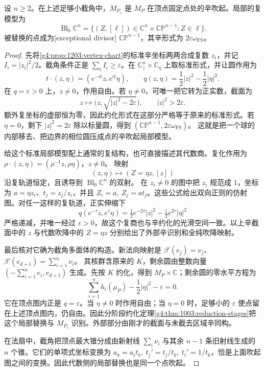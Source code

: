 \begin{proposition}\label{g4:prop:1205:corner-blowup}
	设 \(n\ge2\)。在上述足够小截角中，\(M_{P_\varepsilon}\) 是 \(M_P\) 在顶点固定点处的辛吹起。局部的复模型为
	\[
		\operatorname{Bl}_0\mathbb C^n
		=\{(Z,[\ell])\in\mathbb C^n\times\mathbb{CP}^{n-1}:Z\in\ell\}.
	\]
	被替换的点成为[exceptional divisor]
	\(\mathbb{CP}^{n-1}\)，其辛形式为 \(2\varepsilon\omega_{\mathrm{FS}}\)。
\end{proposition}
\begin{proof}
	先将\cref{g4:prop:1203:vertex-chart}的标准辛坐标两两合成复数 \(z_i\)，并记
	\(I_i=|z_i|^2/2\)。截角条件正是 \(\sum_iI_i\ge\varepsilon\)。在
	\(\mathbb C^n_z\times\mathbb C_\eta\) 上取标准形式，并让圆作用为
	\[
		t\cdot(z,\eta)=(e^{-it}z,e^{it}\eta),\qquad
		q(z,\eta)=\frac12|z|^2-\frac12|\eta|^2.
	\]
	在 \(q=\varepsilon>0\) 上，\(z\ne0\)，作用自由。若 \(\eta\ne0\)，可唯一把它转为正实数，截面为
	\[
		z\longmapsto\bigl(z,\sqrt{|z|^2-2\varepsilon}\bigr),
		\qquad |z|^2>2\varepsilon.
	\]
	额外复坐标的虚部恒为零，因此约化形式在这部分严格等于原来的标准形式。若 \(\eta=0\)，剩下
	\(|z|^2=2\varepsilon\) 除以标量圆，得到
	\((\mathbb{CP}^{n-1},2\varepsilon\omega_{\mathrm{FS}})\)。
	这就是把一个球的内部移去、把边界的相位圆压成点的辛吹起局部模型。

	给这个标准局部模型配上通常的复结构，也可直接描述其代数商。复化作用为
	\(\rho\cdot(z,\eta)=(\rho^{-1}z,\rho\eta)\)，\(z\ne0\)。
	映射
	\[
		(z,\eta)\longmapsto(Z=\eta z,[z])
	\]
	沿复轨道恒定，且诱导到 \(\operatorname{Bl}_0\mathbb C^n\) 的双射。
	在 \(z_i\ne0\) 的图中把 \(z_i\) 规范成 \(1\)，坐标为
	\(a=\eta z_i\)、\(t_j=z_j/z_i\)，并且
	\(Z_i=a,\ Z_j=at_j\)。这些公式给出双向正则的仿射图。对任一这样的复轨道，正实伸缩下
	\[
		q(e^{-\tau}z,e^\tau\eta)
		=\tfrac12e^{-2\tau}|z|^2-\tfrac12e^{2\tau}|\eta|^2
	\]
	严格递减，并唯一经过 \(\varepsilon>0\)，故这个复商也与辛约化的光滑空间一致。以上辛截面中的 \(z\) 与代数吹降中的 \(Z=\eta z\) 分别给出了外部辛识别和全纯吹降映射。

	最后核对它确为截角多面体的构造。新法向映射是
	\(\beta'(e_j)=\nu_j\)、\(\beta'(e_{d+1})=\sum_{i=1}^n\nu_i\)。
	其核群含原来的 \(K\)，剩余圆由整数向量
	\((-\sum_{i=1}^n e_i,e_{d+1})\) 生成。先按 \(K\) 约化，得到
	\(M_P\times\mathbb C\)；剩余圆的零水平方程为
	\[
		\sum_{i=1}^n h_i(\mu_P)-\frac12|\eta|^2-\varepsilon=0.
	\]
	它在顶点图内正是 \(q=\varepsilon\)。当 \(\eta\ne0\) 时作用自由；当 \(\eta=0\) 时，足够小的 \(\varepsilon\) 使点留在上述顶点图内，仍自由。因此分阶段约化定理\cref{g4:thm:1003:reduction-stages}把这个局部替换与 \(M_{P_\varepsilon}\) 识别。外部部分由刚才的截面与未截去区域辛同构。

	在法扇中，截角把顶点最大锥分成由新射线
	\(\sum_i\nu_i\) 与其余 \(n-1\) 条旧射线生成的 \(n\) 个锥。它们的单项式坐标变换为
	\(a_k=a_it_k,\ t_j'=t_j/t_k,\ t_i'=1/t_k\)，恰是上面吹起图之间的变换。因此代数侧的局部替换也是同一个点吹起。
\end{proof}

